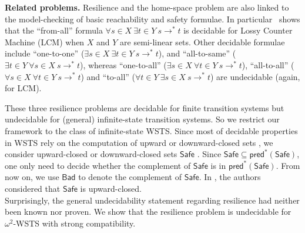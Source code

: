 \documentclass[runningheads]{llncs}
\newcommand{\alain}[1]{\todo[inline,color=red!20]{{\bf AF:} #1}}
\newcommand{\pred}{\textsf{pred}}
\newcommand{\Bad}{\textsf{Bad}}
\newcommand{\Safe}{\textsf{Safe}}
\begin{document}
\alain{ce qui suit est à mettre ici ?}
{\bf Related problems.} 
Resilience and the home-space problem are also linked to the 
model-checking of basic reachability and safety formulae. 
In particular~\cite{DBLP:conf/rp/Schnoebelen10} shows that the ``from-all'' formula $\forall s \in X~ \exists t \in Y~ s \to^* t$
is decidable for Lossy Counter Machine (LCM)
when $X$ and $Y$ are semi-linear sets.
Other decidable formulae include ``one-to-one'' ($\exists s \in  X ~ \exists t \in  Y ~ s \to^* 
 t$), and ``all-to-same'' ($\exists t \in  Y ~ \forall s \in  X ~ s \to^*  t$),
whereas ``one-to-all'' ($\exists s \in  X ~ \forall t \in  Y ~ s \to^*  t$), 
``all-to-all'' ($\forall s \in  X ~ \forall t \in  Y ~ s \to^*  t$)
  and ``to-all'' ($\forall t \in  Y  ~ \exists s \in  X ~ s \to^*  t$) are undecidable (again, for LCM). 
  
These three resilience problems are decidable for finite transition systems but undecidable for (general) infinite-state transition systems. So we restrict our framework to the class of infinite-state WSTS. Since most of decidable properties in WSTS rely on the computation of upward or downward-closed sets \cite{DBLP:journals/iandc/AbdullaCJT00,DBLP:journals/tcs/FinkelS01}, we consider upward-closed or downward-closed sets $\Safe$%
. Since $\Safe \subseteq \pred^*(\Safe)$, one only need to decide whether 
the complement of $\Safe$ is in $\pred^*(\Safe)$. From now on, we use $\Bad$ to denote the complement of $\Safe$.
In \cite{DBLP:journals/corr/abs-2108-00889}, the authors considered that $\Safe$ is upward-closed.  \\

Surprisingly, the general undecidability statement regarding resilience had neither been known nor proven.
We show that the resilience problem is undecidable for $\omega^2$-WSTS with strong compatibility. 
\end{document}
